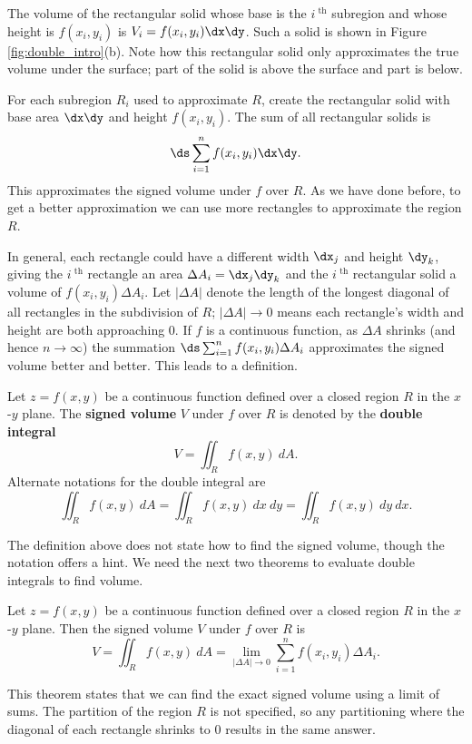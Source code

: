The volume of the rectangular solid whose base is the $i^\text{ th}$ subregion and whose height is $f(x_i,y_i)$ is $V_i=f(x_i,y_i)\dx\dy$. Such a  solid is shown in Figure \ref{fig:double_intro}(b). Note how this rectangular solid only approximates the true volume under the surface; part of the solid is above the surface and part is below.

For each subregion $R_i$ used to approximate $R$, create the rectangular solid with base area $\dx\dy$ and height $f(x_i,y_i)$. 
The sum of all rectangular solids is $$\ds \sum_{i=1}^n f(x_i,y_i)\dx\dy.$$ This approximates the signed volume under $f$ over $R$. As we have done before, to get a better approximation we can use more rectangles to approximate the region $R$.

In general, each rectangle could have a different width $\dx_j$ and height $\dy_k$, giving the $i^\text{ th}$ rectangle an area $\Delta A_i = \dx_j\dy_k$ and the $i^\text{ th}$ rectangular solid a volume of $f(x_i,y_i)\Delta A_i$. Let $|\Delta A|$ denote the length of the longest diagonal of all rectangles in the subdivision of $R$; $|\Delta A|\to 0$ means each rectangle's width and height are both approaching 0. If $f$ is a continuous function, as $\Delta A$ shrinks (and hence $n\to\infty$) the summation $\ds \sum_{i=1}^n f(x_i,y_i)\Delta A_i$ approximates the signed volume better and better. This leads to a definition.

{Let $z=f(x,y)$ be a continuous function defined over a closed region $R$ in the $x$-$y$ plane. The \textbf{signed volume} $V$ under $f$ over $R$ is denoted by the \textbf{double integral}
$$V = \iint_R f(x,y)\ dA.$$
Alternate notations for the double integral are
$$\iint_R f(x,y)\ dA=\iint_R f(x,y)\ dx\ dy=\iint_R f(x,y)\ dy\ dx.$$
}

The definition above does not state how to find the signed volume, though the notation offers a hint. We need the next two theorems to evaluate double integrals to find volume.

{Let $z=f(x,y)$ be a continuous function defined over a closed region $R$ in the $x$-$y$ plane. Then the signed volume $V$ under $f$ over $R$ is
$$V = \iint_R f(x,y)\ dA = \lim_{|\Delta A|\to 0}\sum_{i=1}^n f(x_i,y_i)\Delta A_i.$$
}

This theorem states that we can find the exact signed volume using a limit of sums. The partition of the region $R$ is not specified, so any partitioning where the diagonal of each rectangle shrinks to 0 results in the same answer. 

